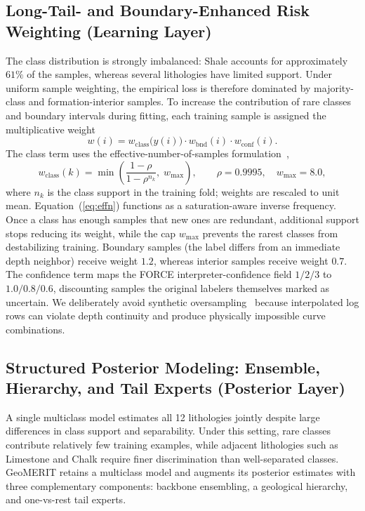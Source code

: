 \documentclass[bdcc,article,submit,pdftex,moreauthors]{Definitions/mdpi}
\begin{document}
\subsection{Long-Tail- and Boundary-Enhanced Risk Weighting (Learning Layer)}
\label{sec:learning}
The class distribution is strongly imbalanced: Shale accounts for approximately $61\%$ of
the samples, whereas several lithologies have limited support. Under uniform sample
weighting, the empirical loss is therefore dominated by majority-class and
formation-interior samples. To increase the contribution of rare classes and boundary
intervals during fitting, each training sample is assigned the multiplicative weight
\begin{equation}
w(i) = w_\text{class}\!\bigl(y(i)\bigr)\cdot w_\text{bnd}(i)\cdot w_\text{conf}(i).
\label{eq:weight}
\end{equation}
The class term uses the effective-number-of-samples
formulation~\cite{cui2019classbalanced},
\begin{equation}
w_\text{class}(k) = \min\!\left(\frac{1-\rho}{1-\rho^{n_k}},\; w_\text{max}\right),\qquad \rho=0.9995,\quad w_\text{max}=8.0,
\label{eq:effn}
\end{equation}
where $n_k$ is the class support in the training fold; weights are rescaled to unit mean.
Equation~(\ref{eq:effn}) functions as a saturation-aware inverse frequency. Once a class has
enough samples that new ones are redundant, additional support stops reducing its weight,
while the cap $w_\text{max}$ prevents the rarest classes from destabilizing training.
Boundary samples (the label differs from an immediate depth neighbor) receive weight $1.2$,
whereas interior samples receive weight $0.7$. The confidence term maps the FORCE
interpreter-confidence field
$1/2/3$ to $1.0/0.8/0.6$, discounting samples the original labelers themselves marked as
uncertain. We deliberately avoid synthetic oversampling~\cite{chawla2002smote} because interpolated
log rows can violate depth continuity and produce physically impossible curve combinations.

\subsection{Structured Posterior Modeling: Ensemble, Hierarchy, and Tail Experts (Posterior Layer)}
\label{sec:posterior}
A single multiclass model estimates all 12 lithologies jointly despite large differences in
class support and separability. Under this setting, rare classes contribute relatively few
training examples, while adjacent lithologies such as Limestone and Chalk require finer
discrimination than well-separated classes. GeoMERIT retains a multiclass model and augments
its posterior estimates with three complementary components: backbone ensembling, a
geological hierarchy, and one-vs-rest tail experts.
\end{document}
